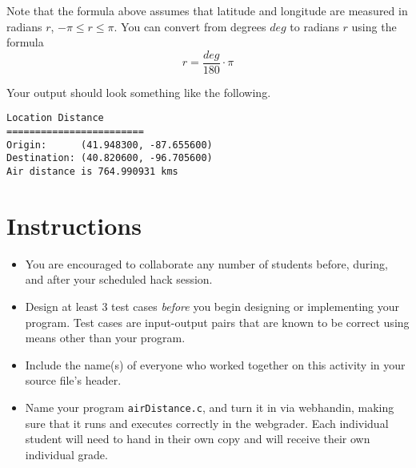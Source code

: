 \documentclass[12pt]{scrartcl}
\begin{document}
Note that the formula above assumes that latitude and longitude are 
measured in radians $r$, $-\pi \leq r \leq \pi$.  You can convert from
degrees $deg$ to radians $r$ using the formula
  $$r = \frac{deg}{180} \cdot \pi$$  

Your output should look something like the following.  

\begin{verbatim}
Location Distance
========================
Origin:      (41.948300, -87.655600)
Destination: (40.820600, -96.705600)
Air distance is 764.990931 kms
\end{verbatim}


\section*{Instructions}

\begin{itemize}
  \item You are encouraged to collaborate any number of students 
  before, during, and after your scheduled hack session.  
  \item Design at least 3 test cases \emph{before} you begin
  designing or implementing your program.  Test cases are 
  input-output pairs that are known to be correct using means
  other than your program.
  \item Include the name(s) of everyone who worked together on
  this activity in your source file's header.
  \item Name your program \texttt{airDistance.c}, and
  turn it in via webhandin, making sure that it runs and executes
  correctly in the webgrader.  Each individual student will need
  to hand in their own copy and will receive their own individual
  grade.
\end{itemize}
  
\end{document}

